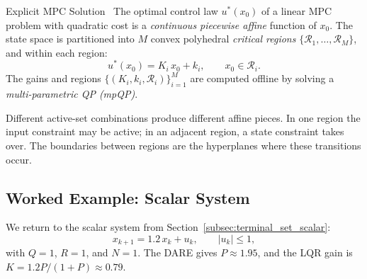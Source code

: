 \begin{defnbox}{Explicit MPC Solution~\cite{Bemporad2002}}
	The optimal control law $u^*(x_0)$ of a linear MPC problem with quadratic cost is a \emph{continuous piecewise affine} function of $x_0$. The state space is partitioned into $M$ convex polyhedral \emph{critical regions} $\{\mathcal{R}_1, \dots, \mathcal{R}_M\}$, and within each region:
	\[
	u^*(x_0) = K_i\, x_0 + k_i, \qquad x_0 \in \mathcal{R}_i.
	\]
	The gains and regions $\{(K_i, k_i, \mathcal{R}_i)\}_{i=1}^M$ are computed offline by solving a \emph{multi-parametric QP (mpQP)}.
\end{defnbox}

Different active-set combinations produce different affine pieces. In one region the input constraint may be active; in an adjacent region, a state constraint takes over. The boundaries between regions are the hyperplanes where these transitions occur.

\subsection{Worked Example: Scalar System}

We return to the scalar system from Section~\ref{subsec:terminal_set_scalar}:
\[
x_{k+1} = 1.2\, x_k + u_k, \qquad |u_k| \le 1,
\]
with $Q = 1$, $R = 1$, and $N = 1$. The DARE gives $P \approx 1.95$, and the LQR gain is $K = 1.2P/(1+P) \approx 0.79$.

